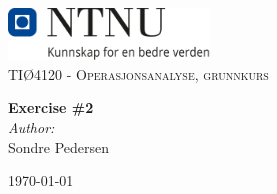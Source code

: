 

\begin{titlepage}
    \vbox{ }
    \vbox{ }
    \begin{center}
        \includegraphics[width=0.40\textwidth]{NTNU_logo.png}\\[1cm]
    \textsc{\Large TIØ4120 - Operasjonsanalyse, grunnkurs}\\[0.5cm]
    \vbox{ }
    
    { \huge \bfseries Exercise \#2}\\[0.4cm]
    
    \large
    \emph{Author:}\\
    Sondre Pedersen
    \vfill
    
    {\large\today}
\end{center}
\end{titlepage}